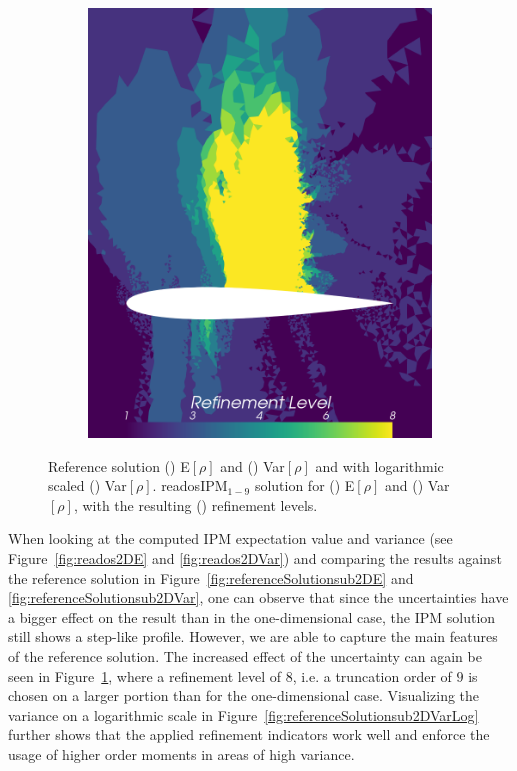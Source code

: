 \begin{figure}[h!]
\begin{subfigure}{0.3\linewidth}
		\includegraphics[scale=0.2]{figs/Euler2D/retadosIPM9-4MaP_4_refinementLevel.png}
		\caption{}
		\label{fig:readosIPMEVar2DRefinement}
	\end{subfigure}
	\caption{Reference solution () E$[\rho]$ and () Var$[\rho]$ and with logarithmic scaled () Var$[\rho]$. readosIPM$_{1-9}$ solution for () E$[\rho]$ and () Var$[\rho]$, with the resulting () refinement levels.}
	\label{fig:refAndreadosIPMEVar2D}
\end{figure}
When looking at the computed IPM expectation value and variance (see Figure~\ref{fig:reados2DE} and \ref{fig:reados2DVar}) and comparing the results against the reference solution in Figure~\ref{fig:referenceSolutionsub2DE} and \ref{fig:referenceSolutionsub2DVar}, one can observe that since the uncertainties have a bigger effect on the result than in the one-dimensional case, the IPM solution still shows a step-like profile. However, we are able to capture the main features of the reference solution. The increased effect of the uncertainty can again be seen in Figure~\ref{fig:readosIPMEVar2DRefinement}, where a refinement level of $8$, i.e. a truncation order of $9$ is chosen on a larger portion than for the one-dimensional case. Visualizing the variance on a logarithmic scale in Figure~\ref{fig:referenceSolutionsub2DVarLog} further shows that the applied refinement indicators work well and enforce the usage of higher order moments in areas of high variance.

